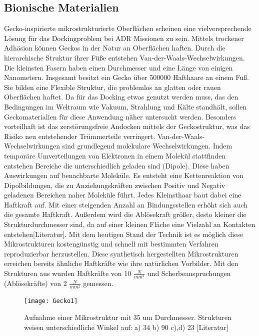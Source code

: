 		\subsection{Bionische Materialien}%
		Gecko-inspirierte mikrostrukturierte Oberflächen scheinen eine vielversprechende Lösung für das Dockingproblem bei ADR Missionen zu sein. Mittels trockener Adhäsion können Geckos in der Natur an Oberflächen haften. Durch die hierarchische Struktur ihrer Füße entstehen Van-der-Waals-Wechselwirkungen. Die kleinsten Fasern haben einen Durchmesser und eine Länge von einigen Nanometern. Insgesamt besitzt ein Gecko über 500000 Hafthaare an einem Fuß. Sie bilden eine Flexible Struktur, die problemlos an glatten oder rauen Oberflächen haftet. Da für das Docking etwas genutzt werden muss, das den Bedingungen im Weltraum wie Vakuum, Strahlung und Kälte standhält, sollen Geckomaterialien für diese Anwendung näher untersucht werden. Besonders vorteilhaft ist das zerstörungsfreie Andocken mittels der Geckostruktur, was das Risiko neu entstehender Trümmerteile verringert.
		Van-der-Waals-Wechselwirkungen sind grundlegend molekulare Wechselwirkungen. Indem temporäre Umverteilungen von Elektronen in einem Molekül stattfinden entstehen Bereiche die unterschiedlich geladen sind (Dipole). Diese haben Auswirkungen auf benachbarte Moleküle. Es entsteht eine Kettenreaktion von Dipolbildungen, die zu Anziehungskräften zwischen Positiv und Negativ geladenen Bereichen naher Moleküle führt. Jedes Kleinsthaar baut dabei eine Haftkraft auf. Mit einer steigenden Anzahl an Bindungsstellen erhöht sich auch die gesamte Haftkraft. Außerdem wird die Ablösekraft größer, desto kleiner die Strukturdurchmesser sind, da auf einer kleinen Fläche eine Vielzahl an Kontakten entstehen[Literatur].
	Mit dem heutigen Stand der Technik ist es möglich diese Mikrostrukturen kostengünstig und schnell mit bestimmten Verfahren reproduzierbar herzustellen. Diese synthetisch hergestellten Mikrostrukturen erreichen bereits ähnliche Haftkräfte wie ihre natürlichen Vorbilder. Mit den Strukturen aus  wurden Haftkräfte von 10 $\frac{N}{mm^{2}}$ und Scherbeanspruchungen (Ablösekräfte)  von 2 $\frac{N}{mm^{2}}$ gemessen.
	\begin{figure}[h]
	\centering
		\texttt{[image: Gecko1]}
	\caption{Aufnahme einer Mikrostruktur mit 35 um Durchmesser. Strukturen weisen unterschiedliche Winkel auf: a) 	34\textdegree{}  b) 90\textdegree{}  c),d) 23\textdegree{} [Literatur]}
	\label{fig:Gecko1}
\end{figure}
